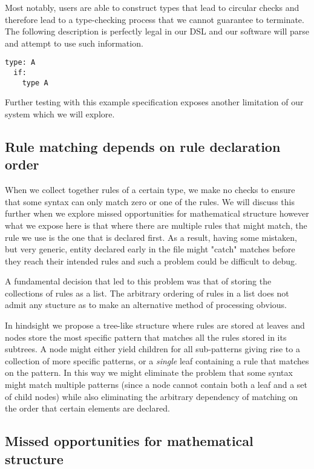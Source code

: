 Most notably, users are able to construct types that lead to circular
checks and therefore lead to a type-checking process that we cannot
guarantee to terminate. The following description is perfectly legal
in our DSL and our software will parse and attempt to use such
information.

\begin{verbatim}
type: A
  if:
    type A
\end{verbatim}

Further testing with this example specification exposes another
limitation of our system which we will explore.

\subsection{Rule matching depends on rule declaration order}

When we collect together rules of a certain type, we make no checks to
ensure that some syntax can only match zero or one of the rules. We
will discuss this further when we explore missed opportunities for
mathematical structure however what we expose here is that where there
are multiple rules that might match, the rule we use is the one that
is declared first. As a result, having some mistaken, but very
generic, entity declared early in the file might "catch" matches
before they reach their intended rules and such a problem could be
difficult to debug.

A fundamental decision that led to this problem was that of storing
the collections of rules as a list. The arbitrary ordering of rules in
a list does not admit any stucture as to make an alternative method of
processing obvious.

In hindsight we propose a tree-like structure where rules are stored
at leaves and nodes store the most specific pattern that matches all
the rules stored in its subtrees. A node might either yield children
for all sub-patterns giving rise to a collection of more specific
patterns, or a \emph{single} leaf containing a rule that matches on the
pattern. In this way we might eliminate the problem that some syntax
might match multiple patterns (since a node cannot contain both a leaf
and a set of child nodes) while also eliminating the arbitrary
dependency of matching on the order that certain elements are declared.

\subsection{Missed opportunities for mathematical structure}

